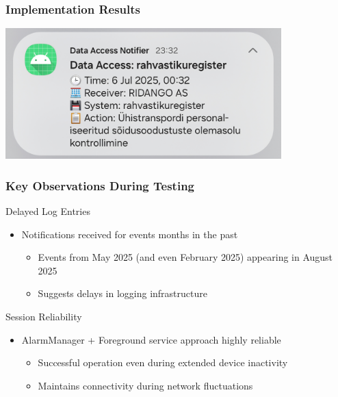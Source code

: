 \documentclass[aspectratio=169,11pt]{beamer}
\begin{document}
\begin{frame}
\frametitle{Implementation Results}
\begin{center}
\includegraphics[width=0.8\textwidth]{../english/figures/IMG_20250812_233325_272.jpg}
\end{center}
\end{frame}

\begin{frame}
\frametitle{Key Observations During Testing}
\begin{block}{Delayed Log Entries}
\begin{itemize}
    \item Notifications received for events months in the past
    \begin{itemize}
        \item Events from May 2025 (and even February 2025) appearing in August 2025
        \item Suggests delays in logging infrastructure
    \end{itemize}
\end{itemize}
\end{block}

\begin{block}{Session Reliability}
\begin{itemize}
    \item AlarmManager + Foreground service approach highly reliable
    \begin{itemize}
        \item Successful operation even during extended device inactivity
        \item Maintains connectivity during network fluctuations
    \end{itemize}
\end{itemize}
\end{block}

\end{frame}
\end{document}

